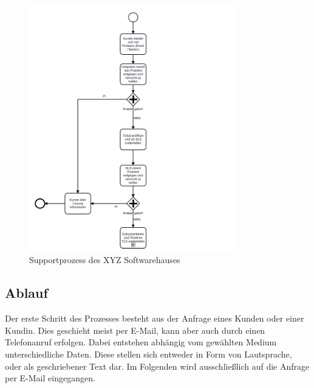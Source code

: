 \begin{figure}[ht]
	\centering
		\includegraphics[width=0.80\textwidth]{images/support_process.PNG}
	\caption{Supportprozess des XYZ Softwarehauses}
	\label{fig:support-process}
\end{figure}

\subsection{Ablauf}
Der erste Schritt des Prozesses besteht aus der Anfrage eines Kunden oder einer Kundin. Dies geschieht meist per E-Mail, kann aber auch durch einen Telefonanruf erfolgen. Dabei entstehen abhängig vom gewählten Medium unterschiedliche Daten. Diese stellen sich entweder in Form von Lautsprache, oder als geschriebener Text dar. Im Folgenden wird ausschließlich auf die Anfrage per E-Mail eingegangen.

